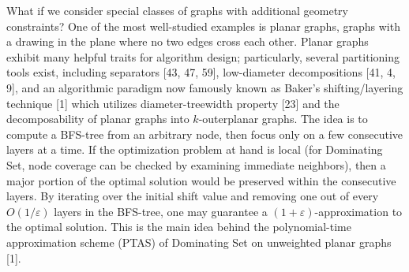 \documentclass[10pt,a4paper]{article}
\begin{document}
\par
\par
What if we consider special classes of graphs with additional geometry constraints? One of the most well-studied examples is planar graphs, graphs with a drawing in the plane where no two edges cross each other. Planar graphs exhibit many helpful traits for algorithm design; particularly, several partitioning tools exist, including separators [43, 47, 59], low-diameter decompositions [41, 4, 9], and an algorithmic paradigm now famously known as Baker’s shifting/layering technique [1] which utilizes diameter-treewidth property [23] and the decomposability of planar graphs into $k$-outerplanar graphs. The idea is to compute a BFS-tree from an arbitrary node, then focus only on a few consecutive layers at a time. If the optimization problem at hand is local (for Dominating Set, node coverage can be checked by examining immediate neighbors), then a major portion of the optimal solution would be preserved within the consecutive layers. By iterating over the initial shift value and removing one out of every $O(1/\varepsilon)$ layers in the BFS-tree, one may guarantee a $(1+\varepsilon)$-approximation to the optimal solution. This is the main idea behind the polynomial-time approximation scheme (PTAS) of Dominating Set on unweighted planar graphs [1].
\par
\par
\end{document}
